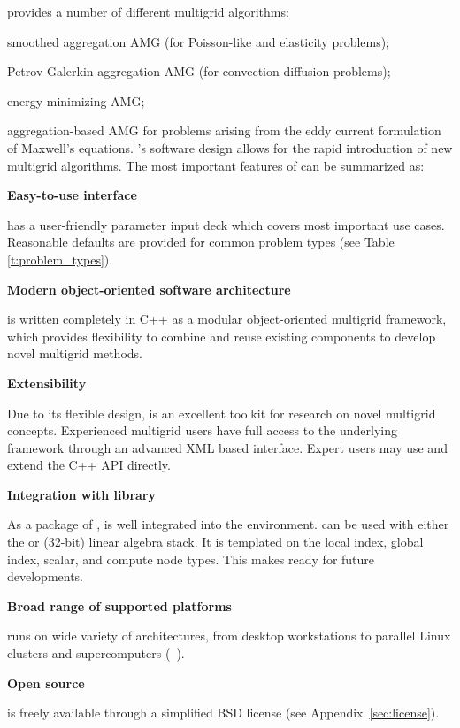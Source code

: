 \muelu{} provides a number of different multigrid algorithms:
\be
  \item smoothed aggregation AMG (for Poisson-like and elasticity problems);
  \item Petrov-Galerkin aggregation AMG (for convection-diffusion problems);
  \item energy-minimizing AMG;
  \item aggregation-based AMG for problems arising from the eddy current
    formulation of Maxwell's equations.
\ee
\muelu's software design allows for the rapid introduction of new multigrid algorithms.
The most important features of \muelu{} can be summarized as:
\begin{description}
  \item \textbf{Easy-to-use interface}

    \muelu{} has a user-friendly parameter input deck which covers
    most important use cases.  Reasonable defaults are provided for common problem types
    (see Table \ref{t:problem_types}).

  \item \textbf{Modern object-oriented software architecture}

    \muelu{} is written completely in C++ as a modular object-oriented multigrid
    framework, which provides flexibility to combine and reuse existing
    components to develop novel multigrid methods.

  \item \textbf{Extensibility}

    Due to its flexible design, \muelu{} is an excellent toolkit for
    research on novel multigrid concepts. Experienced multigrid users have full
    access to the underlying framework through an advanced XML based interface.
    Expert users may use and extend the C++ API directly.

  \item \textbf{Integration with \trilinos{} library}

    As a package of \trilinos, \muelu{} is well integrated into the \trilinos
    environment. \muelu{} can be used with either the \tpetra{} or \epetra{}
    (32-bit) linear algebra stack. It is templated on the local index, global
    index, scalar, and compute node types. This makes \muelu{} ready for
    future developments.

  \item \textbf{Broad range of supported platforms}

    \muelu{} runs on wide variety of architectures, from desktop workstations to
    parallel Linux clusters and supercomputers (~\cite{lin2014}).

  \item \textbf{Open source}

    \muelu{} is freely available through a simplified BSD license (see Appendix~\ref{sec:license}).
\end{description}

